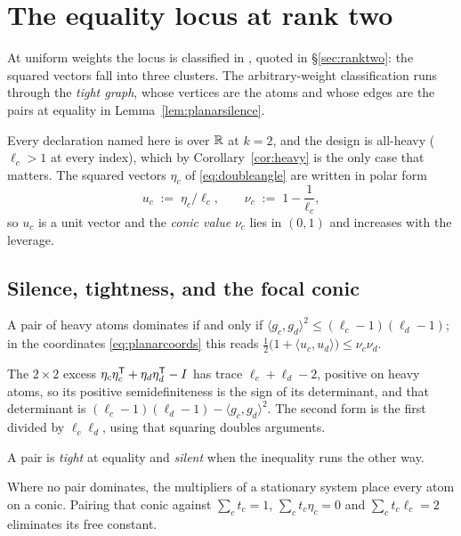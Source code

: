 \section{The equality locus at rank two}\label{app:planar}

At uniform weights the locus is classified in \cite{Nesterenko2026real},
quoted in \S\ref{sec:ranktwo}: the squared vectors fall into three
clusters.  The arbitrary-weight classification runs through the
\emph{tight graph}, whose vertices are the atoms and whose edges are the
pairs at equality in Lemma~\ref{lem:planarsilence}.

Every declaration named here is over $\mathbb{R}$ at $k=2$, and the design is
all-heavy ($\ell_c>1$ at every index), which by
Corollary~\ref{cor:heavy} is the only case that matters.  The squared
vectors $\eta_c$ of \eqref{eq:doubleangle} are written in polar form
\begin{equation}\label{eq:planarcoords}
  u_c\;:=\;\eta_c/\ell_c ,
  \qquad
  \nu_c\;:=\;1-\frac1{\ell_c} ,
\end{equation}
so $u_c$ is a unit vector and the \emph{conic value} $\nu_c$ lies in
$(0,1)$ and increases with the leverage.

\subsection{Silence, tightness, and the focal conic}\label{app:planardict}

\begin{lemma}[Lean]\label{lem:planarsilence}
A pair of heavy atoms dominates if and only if
$\langle g_c,g_d\rangle^2\le(\ell_c-1)(\ell_d-1)$; in the coordinates
\eqref{eq:planarcoords} this reads
$\tfrac12\bigl(1+\langle u_c,u_d\rangle\bigr)\le\nu_c\nu_d$.
\end{lemma}

The $2\times2$ excess $\eta_c\eta_c^{\mathsf{T}}+\eta_d\eta_d^{\mathsf{T}}-I$ has trace
$\ell_c+\ell_d-2$, positive on heavy atoms, so its positive
semidefiniteness is the sign of its determinant, and that determinant is
$(\ell_c-1)(\ell_d-1)-\langle g_c,g_d\rangle^2$.  The second form is the
first divided by $\ell_c\ell_d$, using that squaring doubles arguments.

A pair is \emph{tight} at equality and \emph{silent} when the inequality
runs the other way.

Where no pair dominates, the multipliers of a stationary system place
every atom on a conic.  Pairing that conic against $\sum_ct_c=1$,
$\sum_ct_c\eta_c=0$ and $\sum_ct_c\ell_c=2$ eliminates its free constant.


